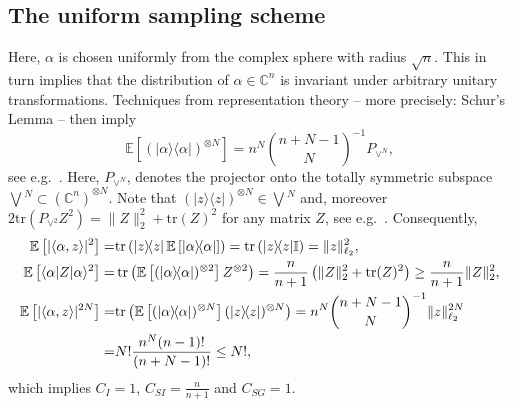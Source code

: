 \subsection{The uniform sampling scheme}

Here, $\alpha$ is chosen uniformly from the complex sphere with radius $\sqrt{n}$.
This in turn implies that the distribution of $\alpha \in \mathbb{C}^n$ is invariant under arbitrary unitary transformations.
Techniques from representation theory -- more precisely: Schur's Lemma -- then imply
\begin{equation}
  \label{eq:from_schur}
  \mathbb{E} \left[ (|\alpha \rangle \! \langle \alpha| )^{\otimes N} \right] =
  n^N \binom{n+N-1}{N}^{-1}  P_{\vee^N},
\end{equation}
see e.g.\ \cite[Lemma~1]{scott_tight_2006}.
Here, $ P_{\vee^N}$, denotes the projector onto the totally symmetric subspace $\bigvee\!^N \subset \left( \mathbb{C}^n \right)^{\otimes N}$.
Note that $\left(| z \rangle \! \langle  z| \right)^{\otimes N} \in \bigvee\!^N$ and, moreover $2 \mathrm{tr} \left(  P_{\vee^2}  Z^2 \right)= \|  Z \|_2^2 + \mathrm{tr} ( Z)^2$ for any matrix $ Z$, see e.g.\ \cite[Lemma~17]{kueng_low_2016}.
Consequently,
\begin{align}
  \mathbb{E} \left[ | \langle\alpha, z \rangle|^2 \right]
  =& \mathrm{tr} \left( | z \rangle \! \langle  z| \, \mathbb{E} \left[ |\alpha \rangle \! \langle\alpha| \right] \right)
  = \mathrm{tr} \left( | z \rangle \! \langle  z| \mathbb{I} \right) = \|  z \|_{\ell_2}^2, \\
  \mathbb{E} \left[
  \langle\alpha| Z |\alpha \rangle^2 \right]
  =& \operatorname{tr} \left( \mathbb{E} \left[ (|\alpha \rangle \! \langle\alpha|)^{\otimes 2} \right]  Z^{\otimes 2} \right)
  = \frac{n}{n+1} \left( \|  Z \|_2^2 + \mathrm{tr}( Z)^2 \right) \geq \frac{n}{n+1} \|  Z \|_2^2, \\
  \mathbb{E} \left[ | \langle\alpha,  z \rangle |^{2N} \right]
  =& \mathrm{tr} \left(\mathbb{E} \left[ (|\alpha \rangle \! \langle\alpha|)^{\otimes N} \right]  (| z\rangle \! \langle  z|)^{\otimes N}  \right)
  = n^N \binom{n+N-1}{N}^{-1} \|  z \|_{\ell_2}^{2N} \\
  =& N! \frac{n^N (n-1)!}{(n+N-1)!} \leq N!,
\end{align}
which implies $C_I=1$, $C_{SI} = \frac{n}{n+1}$ and $C_{SG}=1$.


